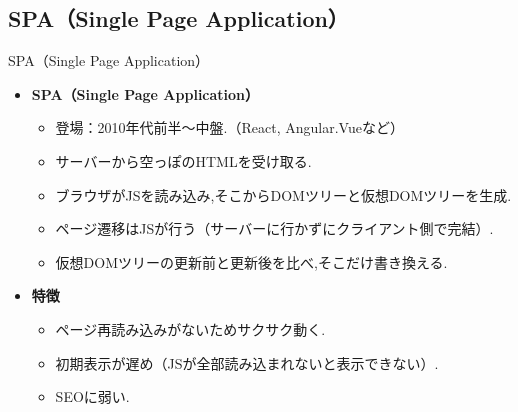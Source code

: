 \documentclass[aspectratio=169]{beamer}
\begin{document}
\subsection{SPA（Single Page Application）}

\begin{frame}{SPA（Single Page Application）}
    \begin{itemize}
        \setlength{\parskip}{1em}
        \item\textbf{SPA（Single Page Application）}
        \begin{itemize}
            \setlength{\parskip}{1em}
            \item 登場：2010年代前半～中盤.（React, Angular.Vueなど）
            \item サーバーから空っぽのHTMLを受け取る.
            \item ブラウザがJSを読み込み,そこからDOMツリーと仮想DOMツリーを生成.
            \item ページ遷移はJSが行う（サーバーに行かずにクライアント側で完結）.
            \item 仮想DOMツリーの更新前と更新後を比べ,そこだけ書き換える.
        \end{itemize}
        \item\textbf{特徴}
        \begin{itemize}
            \setlength{\parskip}{1em}
            \item ページ再読み込みがないためサクサク動く.
            \item 初期表示が遅め（JSが全部読み込まれないと表示できない）.
            \item SEOに弱い.
        \end{itemize}
    \end{itemize}
\end{frame}
\end{document}
